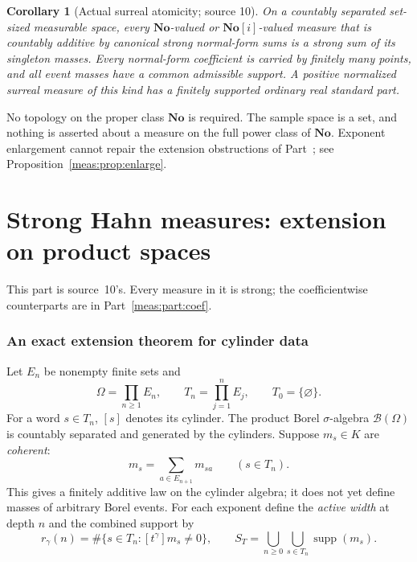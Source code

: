 \documentclass[11pt]{article}
\numberwithin{equation}{section}
\newtheorem{corollary}[theorem]{Corollary}
\theoremstyle{definition}
\theoremstyle{remark}
\newcommand{\No}{\mathbf{No}}
\newcommand{\B}{\mathcal B}
\newcommand{\supp}{\operatorname{supp}}
\newcommand{\coef}[2]{[t^{#1}]#2}
\begin{document}
\begin{corollary}[Actual surreal atomicity; source 10]\label{meas:cor:actual}
On a countably separated set-sized measurable space, every $\No$-valued or
$\No[i]$-valued measure that is countably additive by canonical strong
normal-form sums is a strong sum of its singleton masses. Every normal-form
coefficient is carried by finitely many points, and all event masses have a
common admissible support. A positive normalized surreal measure of this kind
has a finitely supported ordinary real standard part.
\end{corollary}

No topology on the proper class $\No$ is required. The sample space is a set,
and nothing is asserted about a measure on the full power class of $\No$.
Exponent enlargement cannot repair the extension obstructions of
Part~\ref{meas:part:products}; see Proposition~\ref{meas:prop:enlarge}.

\part{Strong Hahn measures: extension on product spaces}\label{meas:part:products}

This part is source~10's. Every measure in it is strong; the coefficientwise
counterparts are in Part~\ref{meas:part:coef}.

\section{An exact extension theorem for cylinder data}\label{meas:sec:cylinder}

Let $E_n$ be nonempty finite sets and
\[
 \Omega=\prod_{n\ge1}E_n,\qquad T_n=\prod_{j=1}^{n}E_j,\qquad T_0=\{\varnothing\}.
\]
For a word $s\in T_n$, $[s]$ denotes its cylinder. The product Borel
$\sigma$-algebra $\B(\Omega)$ is countably separated and generated by the
cylinders. Suppose $m_s\in K$ are \emph{coherent}:
\begin{equation}\label{meas:eq:coherence}
 m_s=\sum_{a\in E_{n+1}}m_{sa}\qquad(s\in T_n).
\end{equation}
This gives a finitely additive law on the cylinder algebra; it does not yet
define masses of arbitrary Borel events. For each exponent define the
\emph{active width} at depth $n$ and the combined support by
\begin{equation}\label{meas:eq:width}
 r_\gamma(n)=\#\{s\in T_n:\coef{\gamma}{m_s}\ne0\},\qquad
 S_T=\bigcup_{n\ge0}\bigcup_{s\in T_n}\supp(m_s).
\end{equation}
\end{document}
